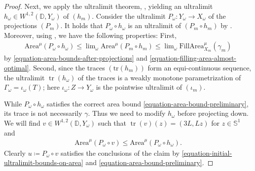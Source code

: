 \documentclass[a4paper,leqno]{amsart}
\numberwithin{equation}{section}
\theoremstyle{remark}
\theoremstyle{remark}
\DeclareMathOperator{\trace}{tr}
\begin{document}
\begin{proof}
Next, we apply the ultralimit theorem, , yielding an ultralimit $h_\omega \in W^{1,2}( \mathbb{D}, Y_\omega )$ of $( h_m )$. Consider the ultralimit $P_\omega \colon Y_\omega \to X_\omega$ of the projections $( P_m )$. It holds that $P_\omega \circ h_\omega$ is an ultralimit of $( P_m \circ h_m )$ by . Moreover, using , we have the following properties: First,
\begin{align}\label{equation-area-bound-preliminary}
    \mathrm{Area}^{\mu}( P_\omega \circ h_\omega )
    \leq
    \lim\nolimits_{\omega}
    \mathrm{Area}^{\mu}( P_m \circ h_m )
    \leq
    \lim\nolimits_{\omega} \mathrm{FillArea}^{\mu}_{X_m}( \gamma_m )
\end{align}
by \eqref{equation-area-bounds-after-projections} and \eqref{equation-filling-area-almost-optimal}. Second, since the traces $( \mathrm{tr}(h_m) )$ form an equi-continuous sequence, the ultralimit $\trace( h_\omega )$ of the traces is a weakly monotone parametrization of $\Gamma_\omega = \iota_\omega( T )$; here $\iota_\omega \colon Z \rightarrow Y_\omega$ is the pointwise ultralimit of $( \iota_m )$.

While $P_\omega \circ h_\omega$ satisfies the correct area bound \eqref{equation-area-bound-preliminary}, its trace is not necessarily $\gamma$. Thus we need to modify $h_\omega$ before projecting down. We will find $v \in W^{1,2}( \mathbb{D}, Y_\omega )$ such that $\trace(v)(z) = ( 3L, L z )$ for $z \in \mathbb{S}^1$ and
\begin{align}\label{equation-initial-ultralimit-bounds-on-area}
    \mathrm{Area}^{\mu}( P_\omega \circ v ) \leq \mathrm{Area}^{\mu}( P_\omega \circ h_\omega ).
\end{align}
Clearly $u \coloneqq P_\omega \circ v$ satisfies the conclusions of the claim by \eqref{equation-initial-ultralimit-bounds-on-area} and \eqref{equation-area-bound-preliminary}.



\end{proof}
\end{document}
